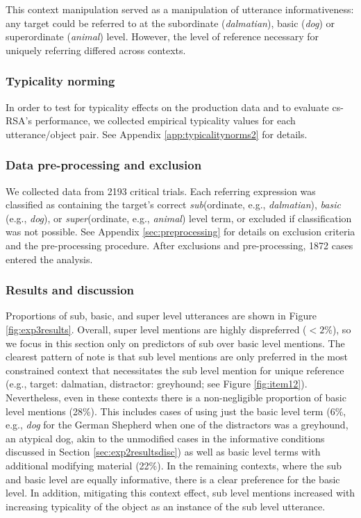 \documentclass[11pt]{article}
\newcommand{\figref}[1]{Figure \ref{#1}}
\newcommand{\appref}[1]{Appendix \ref{#1}}
\newcommand{\sectionref}[1]{Section \ref{#1}}
\begin{document}
This context manipulation served as a manipulation of utterance informativeness: any target could be referred to at the subordinate (\emph{dalmatian}), basic (\emph{dog}) or superordinate (\emph{animal}) level. However, the level of reference necessary for uniquely referring differed across contexts.


\subsubsection{Typicality norming}
\label{sec:typicalitynormingnominal}

In order to test for typicality effects on the production data and to evaluate cs-RSA's performance, we collected empirical typicality values for each utterance/object pair. See \appref{app:typicalitynorms2} for details.

\subsubsection{Data pre-processing and exclusion}

We collected data from 2193 critical trials. Each referring expression was classified as containing the  target's correct \emph{sub}(ordinate, e.g., \emph{dalmatian}), \emph{basic} (e.g., \emph{dog}), or \emph{super}(ordinate, e.g., \emph{animal}) level term, or excluded if classification was not possible. See \appref{sec:preprocessing} for details on exclusion criteria and the pre-processing procedure.  After exclusions and pre-processing, 1872 cases entered the analysis.


\subsubsection{Results and discussion}


Proportions of sub, basic, and super level utterances are shown in \figref{fig:exp3results}. Overall, super level mentions are highly dispreferred ($< 2\%$), so we focus in this section only on predictors of sub over basic level mentions. The clearest pattern of note is that sub level mentions are only preferred in the most constrained context that necessitates the sub level mention for unique reference (e.g., target: dalmatian, distractor: greyhound; see \figref{fig:item12}). Nevertheless, even in these contexts there is a non-negligible proportion of basic level mentions (28\%). This includes cases of using just the basic level term (6\%, e.g., \emph{dog} for the German Shepherd when one of the distractors was a greyhound, an atypical dog, akin to the unmodified cases in the informative conditions discussed in \sectionref{sec:exp2resultsdisc}) as well as basic level terms with additional modifying material (22\%). In the remaining contexts, where the sub and basic level are equally informative, there is a clear preference for the basic level. In addition, mitigating this context effect, sub level mentions increased with increasing typicality of the object as an instance of the sub level utterance.
\end{document}
